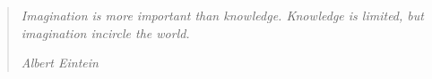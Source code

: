 \documentclass[../Main/thesis.tex]{subfiles}
\begin{document}
\chapter*{}
\null\vfill
\begin{quotation}
\em %
Imagination is more important than knowledge. Knowledge is limited, but imagination incircle the world.

\em
\medskip
\raggedleft
Albert Eintein
\end{quotation}
\vfill\vfill
\end{document}
